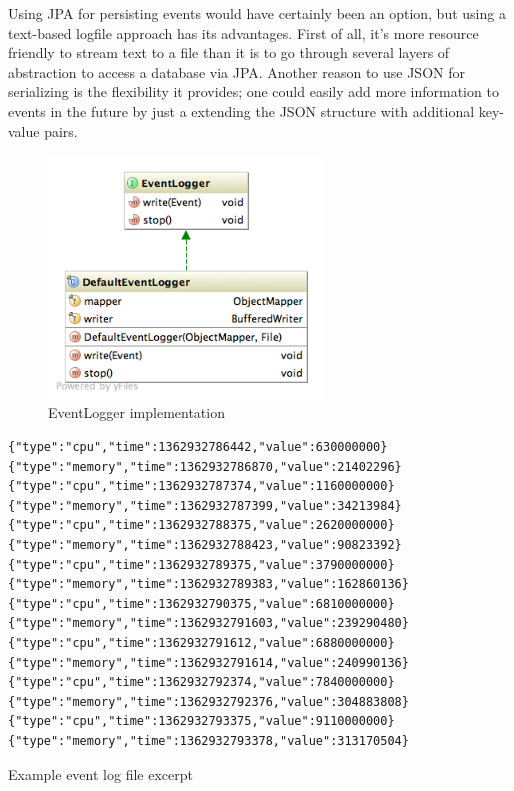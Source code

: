 Using \gls{JPA} for persisting events would have certainly been an option, but using a text-based logfile approach has its advantages. First of all, it's more resource friendly to stream text to a file than it is to go through several layers of abstraction to access a database via \gls{JPA}. Another reason to use \gls{JSON} for serializing is the flexibility it provides; one could easily add more information to events in the future by just a extending the \gls{JSON} structure with additional key-value pairs.

\begin{figure}[H]
\centering
\includegraphics[width=0.65\textwidth, trim=20px 19px 0 0, clip=true]{logging.png}
\caption{EventLogger implementation}
\end{figure}

\begin{listing}[H]
\begin{verbatim}
{"type":"cpu","time":1362932786442,"value":630000000}
{"type":"memory","time":1362932786870,"value":21402296}
{"type":"cpu","time":1362932787374,"value":1160000000}
{"type":"memory","time":1362932787399,"value":34213984}
{"type":"cpu","time":1362932788375,"value":2620000000}
{"type":"memory","time":1362932788423,"value":90823392}
{"type":"cpu","time":1362932789375,"value":3790000000}
{"type":"memory","time":1362932789383,"value":162860136}
{"type":"cpu","time":1362932790375,"value":6810000000}
{"type":"memory","time":1362932791603,"value":239290480}
{"type":"cpu","time":1362932791612,"value":6880000000}
{"type":"memory","time":1362932791614,"value":240990136}
{"type":"cpu","time":1362932792374,"value":7840000000}
{"type":"memory","time":1362932792376,"value":304883808}
{"type":"cpu","time":1362932793375,"value":9110000000}
{"type":"memory","time":1362932793378,"value":313170504}
\end{verbatim}
\caption{Example event log file excerpt}
\label{lst:event-log}
\end{listing}

